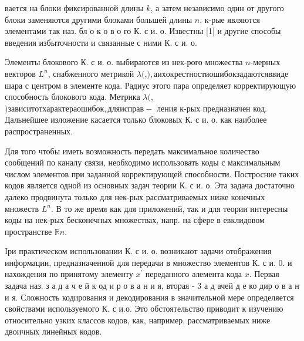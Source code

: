 \documentclass[10pt]{article}
\begin{document}
вается на блоки фиксированной длины $k$, а затем независимо один от другого блоки заменяются другими блоками большей длины $n$, к-рые являются элементами так наз. бл о к о в о го К. с и. о. Известны [1] и другие способы введения избыточности и связанные с ними К. с и. о.



Элементы блокового К. с и. о. выбираются из нек-рого множества $n$-мерных векторов $L^{n}$, снабженного метрикой $\lambda($,$) , а их окрестности ошибок задаются в виде$ шара с центром в элементе кода. Радиус этого пара определяет корректирующую способность блокового кода. Метрика $\lambda($,$) зависит от характера ошибок, для исправ-$ ления к-рых предназначен код. Дальнейшее изложение касается только блоковых К. с и. о. как наиболее распространенных.



Для того чтобы иметь возможность передать максимальное количество сообщений по каналу связи, необходимо использовать коды с максимальным числом элементов при заданной корректирующей способности. Постросние таких кодов является одной из основных задач теории К. с и. о. Эта задача достаточно далеко продвинута только для нек-рых рассматриваемых ниже конечных множеств $L^{n}$. В то же время как для приложений, так и для теории интересны коды на нек-рых бесконечных множествах, напр. на сфере в евклидовом пространстве $\mathbb{R} n$.



Iри практическом использовании К. с и. о. возникают задачи отображения информации, предназначенной для передачи в множество элементов К. с и. 0. и нахождения по принятому элементу $x^{\prime}$ переданного әлемента кода $x$. Первая задача наз. з а д а ч е й к од и р о в а н и я, вторая - 3 а д ачей д е ко дир о в а н и я. Сложность кодирования и декодирования в значительной мере определяется свойствами используемого К. с и.о. Это обстоятельство приводит к изучению относительно узких классов кодов, как, например, рассматриваемых ниже двоичных линейных кодов.
\end{document}
